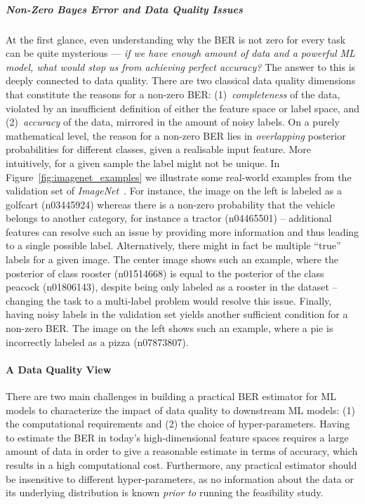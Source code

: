 \documentclass[11pt]{article}
\begin{document}
\subparagraph{Non-Zero Bayes Error and Data Quality Issues}
At the first glance, even understanding why the BER is not zero for every task can be quite mysterious --- 
\textit{if we have enough amount of data and 
a powerful ML model, what would stop us from 
achieving perfect accuracy?}
The answer to this is deeply connected to 
data quality.
There are two classical data quality dimensions that constitute the reasons for a non-zero BER: (1)~\textit{completeness} of the data, violated by an insufficient definition of either the feature space or label space, and (2)~\textit{accuracy} of the data, mirrored in the amount of noisy labels. 
On a purely mathematical level, the reason for a non-zero BER lies in \textit{overlapping} posterior probabilities for different classes, given a realisable input feature.
More intuitively, for a given sample the label might not be unique.
In Figure~\ref{fig:imagenet_examples} we illustrate some real-world examples from the validation set of \textit{ImageNet}~\cite{deng2009imagenet}.
For instance, the image on the left is labeled as a golfcart (n03445924) 
whereas there is a non-zero probability that the vehicle belongs to another category, for instance a tractor (n04465501) -- additional features can resolve such an issue by providing more information and thus leading to a single possible label.
Alternatively, there might in fact be multiple ``true'' labels for a given image. The center image shows such an example, where the posterior of class rooster (n01514668) is equal to the posterior of the class peacock (n01806143), despite being only labeled as a rooster in the dataset -- changing the task to a multi-label problem would resolve this issue.
Finally, having noisy labels in the validation set yields another sufficient condition for a non-zero BER.
The image on the left shows such an example, where a pie is incorrectly labeled as a pizza (n07873807).

\paragraph*{A Data Quality View}
There are two main challenges in building 
a practical BER estimator for ML models to
characterize the impact of data quality to 
downstream ML models: (1) the computational requirements and (2) the choice of hyper-parameters. Having to estimate the BER in today's high-dimensional feature spaces
requires a large amount of data in order to give a reasonable estimate in terms of accuracy, which results in a high computational cost. Furthermore, any practical estimator should be insensitive to different hyper-parameters, as no information about the data or its underlying distribution is known \emph{prior to} running the feasibility study.
\end{document}
